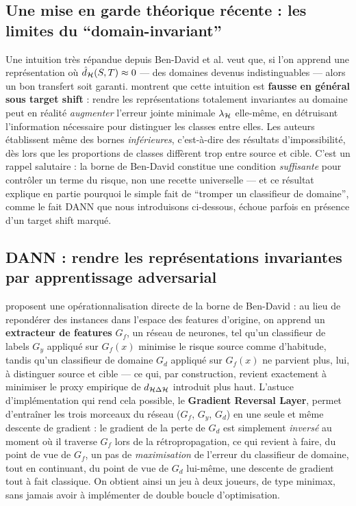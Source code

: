 \documentclass[11pt]{article}
\begin{document}
\subsection{Une mise en garde théorique récente : les limites du \enquote{domain-invariant}}

\begin{recent}
Une intuition très répandue depuis Ben-David et al. veut que, si l'on apprend une représentation où
$\hat d_{\mathcal{H}}(S,T)\approx 0$ --- des domaines devenus indistinguables --- alors un bon transfert soit
garanti. \citet{zhao2019learning} montrent que cette intuition est \textbf{fausse en général sous target
shift} : rendre les représentations totalement invariantes au domaine peut en réalité \emph{augmenter}
l'erreur jointe minimale $\lambda_{\mathcal{H}}$ elle-même, en détruisant l'information nécessaire pour
distinguer les classes entre elles. Les auteurs établissent même des bornes \emph{inférieures},
c'est-à-dire des résultats d'impossibilité, dès lors que les proportions de classes diffèrent trop entre
source et cible. C'est un rappel salutaire : la borne de Ben-David constitue une condition
\emph{suffisante} pour contrôler un terme du risque, non une recette universelle --- et ce résultat
explique en partie pourquoi le simple fait de \enquote{tromper un classifieur de domaine}, comme le fait
DANN que nous introduisons ci-dessous, échoue parfois en présence d'un target shift marqué.
\end{recent}

\subsection{DANN : rendre les représentations invariantes par apprentissage adversarial}

\begin{recent}
\citet{ganin2015dann} proposent une opérationnalisation directe de la borne de Ben-David : au lieu de
repondérer des instances dans l'espace des features d'origine, on apprend un \textbf{extracteur de
features} $G_f$, un réseau de neurones, tel qu'un classifieur de labels $G_y$ appliqué sur $G_f(x)$
minimise le risque source comme d'habitude, tandis qu'un classifieur de domaine $G_d$ appliqué sur
$G_f(x)$ ne parvient plus, lui, à distinguer source et cible --- ce qui, par construction, revient
exactement à minimiser le proxy empirique de $d_{\mathcal{H}\Delta\mathcal{H}}$ introduit plus haut. L'astuce d'implémentation
qui rend cela possible, le \textbf{Gradient Reversal Layer}, permet d'entraîner les trois morceaux du
réseau ($G_f$, $G_y$, $G_d$) en une seule et même descente de gradient : le gradient de la perte de
$G_d$ est simplement \emph{inversé} au moment où il traverse $G_f$ lors de la rétropropagation, ce qui
revient à faire, du point de vue de $G_f$, un pas de \emph{maximisation} de l'erreur du classifieur de
domaine, tout en continuant, du point de vue de $G_d$ lui-même, une descente de gradient tout à fait
classique. On obtient ainsi un jeu à deux joueurs, de type minimax, sans jamais avoir à implémenter de
double boucle d'optimisation.
\end{recent}
\end{document}
